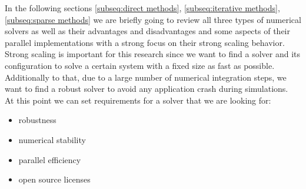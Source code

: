 In the following sections \ref{subseq:direct methods}, \ref{subseq:iterative methods}, \ref{subseq:sparse methods} we are briefly going to review all three types of numerical solvers as well as their advantages and disadvantages and some aspects of their parallel implementations with a strong focus on their strong scaling behavior. Strong scaling is important for this research since we want to find a solver and its configuration to solve a certain system with a fixed size as fast as possible. Additionally to that, due to a large number of numerical integration steps, we want to find a robust solver to avoid any application crash during simulations.\\

At this point we can set requirements for a solver that we are looking for:\\

\begin{itemize}
	\item robustness
	\item numerical stability
	\item parallel efficiency
	\item open source licenses
\end{itemize}


